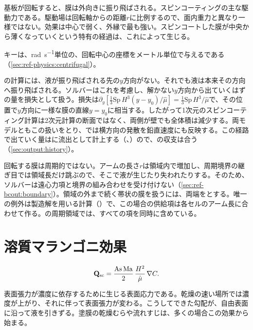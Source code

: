 基板が回転すると、膜は外向きに振り飛ばされる。スピンコーティングの主な駆動力である。駆動場は回転軸からの距離$r$に比例するので、面内重力と異なり一様ではない。効果は中心で弱く、外縁で最も強い。スピンコートした膜が中央から薄くなっていくという特有の経過は、これによって生じる。

キーは、\si{\radian\per\second}単位の、回転中心の座標をメートル単位で与えるである（\cref{sec:ref-physics:centrifugal}）。

\begin{note}
  の計算には、液が振り飛ばされる先の$y$方向がない。それでも液は本来その方向へ振り飛ばされる。ソルバーはこれを考慮し、解かない$y$方向から出ていくはずの量を損失として扱う。損失は$\partial_y[\tfrac13\mathrm{Sp}\,H^3(y-y_0)/\hat\mu] = \tfrac13\mathrm{Sp}\,H^3/\hat\mu$で、その位置で$y$方向に一様な膜の直線$y = y_0$に相当する。したがって1次元のスピンコーティング計算は2次元計算の断面ではなく、両側が壁でも全体積は減少する。両モデルともこの扱いをとり、では横方向の発散を鉛直速度にも反映する。この経路で出ていく量はに流出として計上する（、）ので、の収支は合う（\cref{sec:output:history}）。
\end{note}

回転する膜は周期的ではない。アームの長さ$r$は領域内で増加し、周期境界の継ぎ目では領域長だけ跳ぶので、そこで液が生じたり失われたりする。そのため、ソルバーは遠心力項と境界の組み合わせを受け付けない（\cref{sec:ref-bcout:boundary}）。領域の外まで続く帯状の膜を扱うには、両端をとする。唯一の例外は製造解を用いる計算（）で、この場合の供給項は各セルのアーム長に合わせて作る。の周期領域では、すべての項を同時に含めている。

\section{溶質マランゴニ効果}
\label{sec:terms:marangoni}

\begin{equation}\label{eq:q-sc}
  \mathbf{Q}_{\mathrm{sc}} = \frac{\mathrm{As}\,\mathrm{Ma}}{2}\,\frac{H^{2}}{\hat{\mu}}\,\nabla C.
\end{equation}

表面張力が濃度に依存するために生じる表面応力である。乾燥の速い場所では濃度が上がり、それに伴って表面張力が変わる。こうしてできた勾配が、自由表面に沿って液を引きずる。塗膜の乾燥むらや流れすじは、多くの場合この効果から始まる。

